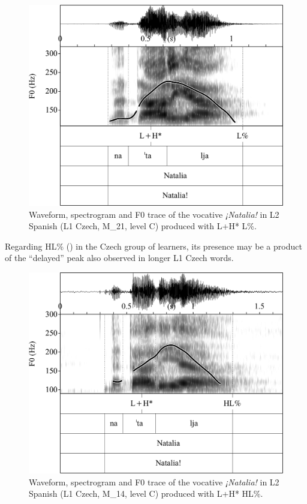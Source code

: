 \begin{figure}


\includegraphics[width=.8\textwidth]{figures/Figure_4.140.png}



\caption{Waveform, spectrogram and F0 trace of the vocative \textit{¡Natalia!} in L2 Spanish (L1 Czech, M\_21, level C) produced with L+H* L\%.}
\label{fig:4.140}
\end{figure}

Regarding HL\% () in the Czech group of learners, its presence may be a product of the “delayed” peak also observed in longer L1 Czech words.

\begin{figure}


\includegraphics[width=.8\textwidth]{figures/Figure_4.141.png}



\caption{Waveform, spectrogram and F0 trace of the vocative \textit{¡Natalia!} in L2 Spanish (L1 Czech, M\_14, level C) produced with L+H* HL\%.}
\label{fig:4.141}
\end{figure}

